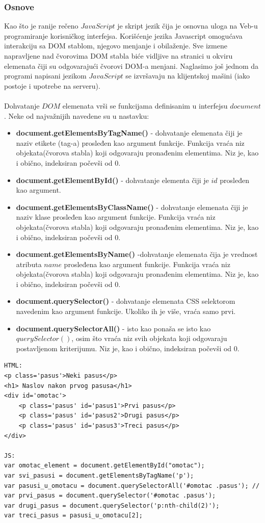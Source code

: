 \documentclass[a4paper]{article}
\begin{document}
\subsubsection{Osnove}
Kao što je ranije rečeno $JavaScript$ je skript jezik čija je osnovna uloga na Veb-u programiranje korisničkog interfejsa. Korišćenje jezika Javascript omogućava interakciju sa DOM stablom,
njegovo menjanje i obilaženje. Sve izmene napravljene nad čvorovima DOM stabla biće
vidljive na stranici u okviru elemenata čiji su odgovarajući čvorovi DOM-a menjani.
Naglasimo još jednom da programi napisani jezikom $JavaScript$ se izvršavaju na klijentskoj mašini (iako postoje i upotrebe na serveru).\\\\
Dohvatanje $DOM$ elemenata vrši se funkcijama definisanim u interfejsu $document$. Neke od najvažnijih navedene su u nastavku:
\begin{itemize}
\item \textbf{document.getElementsByTagName()} - dohvatanje elemenata čiji je naziv etikete (tag-a) prosleđen kao argument funkcije. Funkcija vraća niz objekata(čvorova stabla) koji odgovaraju pronađenim elementima. Niz je, kao i obično, indeksiran počevši od 0.
\item \textbf{document.getElementById()} - dohvatanje elementa čiji je $id$ prosleđen kao argument.
\item \textbf{document.getElementsByClassName()} - dohvatanje elemenata čiji je naziv klase prosleđen kao argument funkcije. Funkcija vraća niz objekata(čvorova stabla) koji odgovaraju pronađenim elementima. Niz je, kao i obično, indeksiran počevši od 0.
\item \textbf{document.getElementsByName()} -dohvatanje elemenata čija je vrednost atributa $name$  prosleđena kao argument funkcije. Funkcija vraća niz objekata(čvorova stabla) koji odgovaraju pronađenim elementima. Niz je, kao i obično, indeksiran počevši od 0.
\item \textbf{document.querySelector()} - dohvatanje elemenata CSS selektorom navedenim kao argument funkcije. Ukoliko ih je više, vraća samo prvi. 
\item \textbf{document.querySelectorAll()} - isto kao ponaša se isto kao $querySelector()$, osim što vraća niz svih objekata koji odgovaraju postavljenom kriterijumu. Niz je, kao i obično, indeksiran počevši od 0.
\end{itemize}
\begin{lstlisting}[backgroundcolor = \color{lightgray}, mathescape=true]
HTML:
<p class='pasus'>Neki pasus</p> 
<h1> Naslov nakon prvog pasusa</h1>
<div id='omotac'>
	<p class='pasus' id='pasus1'>Prvi pasus</p> 
	<p class='pasus' id='pasus2'>Drugi pasus</p>
	<p class='pasus' id='pasus3'>Treci pasus</p>
</div>

JS:
var omotac_element = document.getElementById("omotac");
var svi_pasusi = document.getElementsByTagName('p');
var pasusi_u_omotacu = document.querySelectorAll('#omotac .pasus'); // 
var prvi_pasus = document.querySelector('#omotac .pasus');
var drugi_pasus = document.querySelector('p:nth-child(2)');
var treci_pasus = pasusi_u_omotacu[2];
\end{lstlisting} 	 
\end{document}
